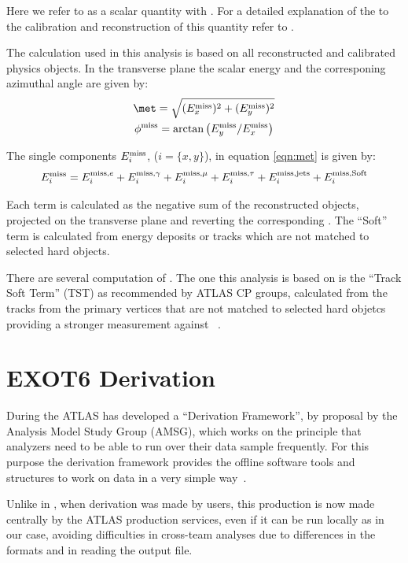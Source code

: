 Here we refer to \met as a scalar quantity with \met. For a detailed explanation of the  to the calibration and reconstruction of this quantity refer to \cite{met}.

The \met calculation used in this analysis is based on all reconstructed and calibrated physics objects. In the transverse plane the scalar energy and the corresponing azimuthal angle are given by:
\begin{gather}
\label{eqn:met}
	\met=\sqrt{(E_x^\textup{miss})^2+(E_y^\textup{miss})^2}\\
	\phi^\textup{miss}=\arctan\big({E_y^\textup{miss}/E_x^\textup{miss}}\big)
\end{gather}

The single components $E_i^\textup{miss}$, ($i=\{x,y\}$), in equation \ref{eqn:met} is given by:
\begin{equation}
	E_i^\textup{miss}=E_i^\textup{miss,$e$}+E_i^\textup{miss,$\gamma$}+E_i^\textup{miss,$\mu$}+E_i^\textup{miss,$\tau$}+E_i^\textup{miss,jets}+E_i^\textup{miss,Soft}
\end{equation}

Each term is calculated as the negative sum of the reconstructed objects, projected on the transverse plane and reverting the corresponding \pt. The ``Soft'' term is calculated from energy deposits or tracks which are not matched to selected hard objects. 

There are several computation of \met. The one this analysis is based on is the ``Track Soft Term'' (TST) as recommended by ATLAS CP groups, calculated from the tracks from the primary vertices that are not matched to selected hard objetcs providing a stronger measurement against \pileup~\cite{met}.

\section{EXOT6 Derivation}
\label{sec:derivation}
During the \RunTwo ATLAS has developed a ``Derivation Framework'', by proposal by the Analysis Model Study Group (AMSG), which works on the principle that analyzers need to be able to run over their data sample frequently. For this purpose the derivation framework provides the offline software tools and structures to work on data in a very simple way~\cite{twiki:DAOD}. 

Unlike in \RunOne, when derivation was made by users, this production is now made centrally by the ATLAS production services, even if it can be run locally as in our case, avoiding difficulties in cross-team analyses due to differences in the formats and in reading the output file.

